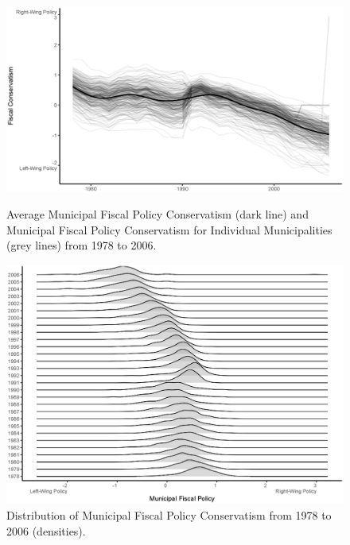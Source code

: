 \documentclass[a4paper,12pt]{article}
\begin{document}
\begin{figure}[htbp]
	\centering 

		\includegraphics[width=1\textwidth]{fiscal_TimeSeries.eps}
		\caption{Average Municipal Fiscal Policy Conservatism (dark line) and Municipal Fiscal Policy Conservatism for Individual Municipalities (grey lines) from 1978 to 2006.}
		\label{fig:timeline}


		\includegraphics[width=1\textwidth]{ConservatismJOY_trend_24092018.eps}
		\caption{Distribution of Municipal Fiscal Policy Conservatism from 1978 to 2006 (densities).}
		\label{fig:lines}
	

	
\end{figure}
\end{document}
